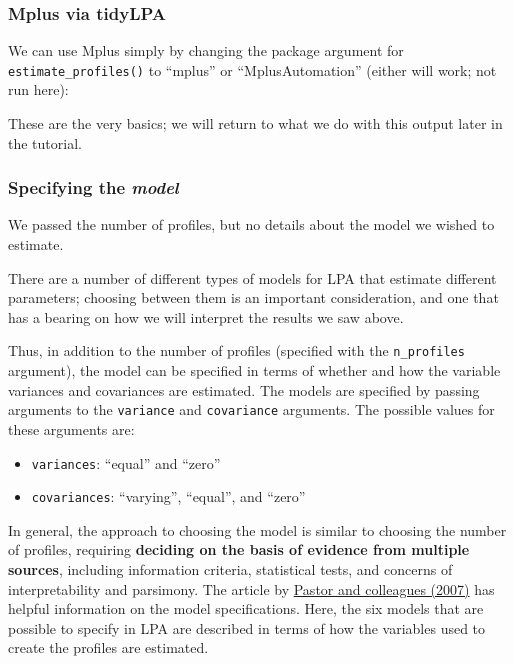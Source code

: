 \documentclass[man]{apa6}
\providecommand{\tightlist}{%
  \setlength{\itemsep}{0pt}\setlength{\parskip}{0pt}}
\begin{document}
\hypertarget{mplus-via-tidylpa}{%
\subsubsection{Mplus via tidyLPA}\label{mplus-via-tidylpa}}

We can use Mplus simply by changing the package argument for
\texttt{estimate\_profiles()} to \enquote{mplus} or \enquote{MplusAutomation} (either will work; not run here):

These are the very basics; we will return to what we do with this output later in the tutorial.

\hypertarget{specifying-the-model}{%
\subsubsection{\texorpdfstring{Specifying the \emph{model}}{Specifying the model}}\label{specifying-the-model}}

We passed the number of profiles, but no details about the model we wished to estimate.

There are a number of different types of models for LPA that estimate different parameters; choosing
between them is an important consideration, and one that has a bearing on how we will interpret the results we saw above.

Thus, in addition to the number of profiles (specified with the \texttt{n\_profiles}
argument), the model can be specified in terms of whether and how the variable
variances and covariances are estimated. The models are specified by passing arguments to the \texttt{variance} and \texttt{covariance}
arguments. The possible values for these arguments are:

\begin{itemize}
\tightlist
\item
  \texttt{variances}: \enquote{equal} and \enquote{zero}
\item
  \texttt{covariances}: \enquote{varying}, \enquote{equal}, and \enquote{zero}
\end{itemize}

In general, the approach to choosing the model is similar to choosing the number of profiles, requiring \textbf{deciding on the basis of evidence from multiple sources}, including information criteria, statistical tests, and concerns of interpretability and parsimony. The article by \href{https://www.sciencedirect.com/science/article/pii/S0361476X06000543}{Pastor and colleagues (2007)} has helpful information on the model specifications. Here, the six models that are possible to specify in LPA are described in terms of how the variables used to create the profiles are estimated.
\end{document}
